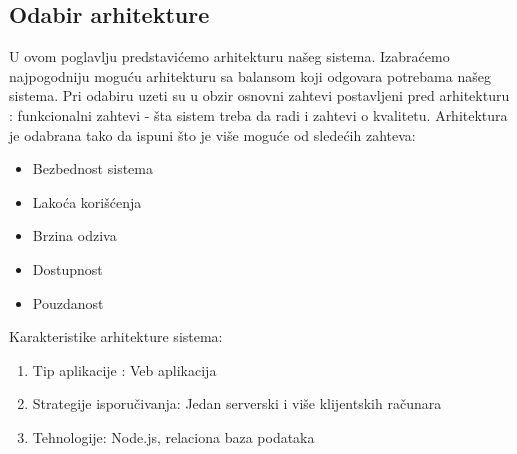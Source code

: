 \subsection{Odabir arhitekture}
U ovom poglavlju predstavićemo arhitekturu našeg sistema. 
Izabraćemo najpogodniju moguću arhitekturu sa balansom koji odgovara potrebama našeg sistema.
Pri odabiru uzeti su u obzir osnovni zahtevi postavljeni pred arhitekturu : funkcionalni zahtevi - šta sistem treba da radi i zahtevi o kvalitetu.
Arhitektura je odabrana tako da ispuni što  je više moguće od sledećih zahteva:
\begin{itemize}
    \item Bezbednost sistema
    \item Lakoća korišćenja
    \item Brzina odziva
    \item Dostupnost
    \item Pouzdanost
\end{itemize}

Karakteristike arhitekture sistema:
\begin{enumerate}
    \item Tip aplikacije : Veb aplikacija
    \item Strategije isporučivanja: Jedan serverski i više klijentskih računara
    \item Tehnologije: Node.js, relaciona baza podataka

\end{enumerate}